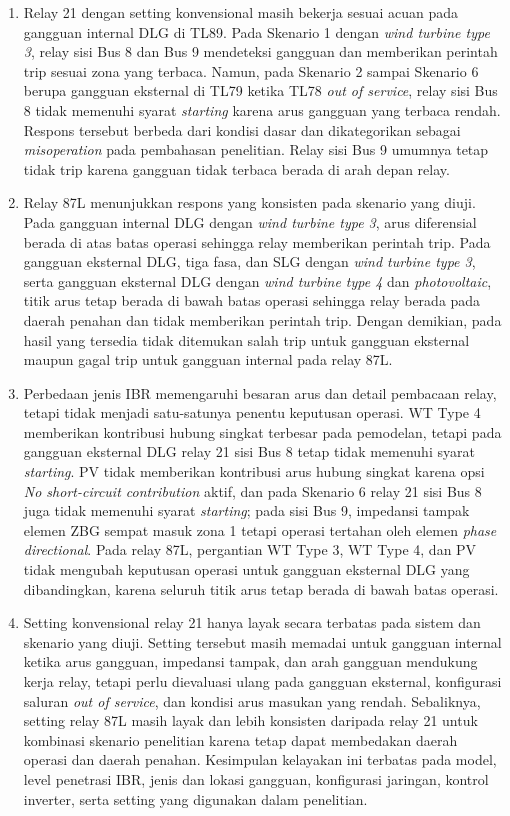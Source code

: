 \begin{enumerate}
	\item Relay 21 dengan setting konvensional masih bekerja sesuai acuan pada gangguan internal DLG di TL89. Pada Skenario 1 dengan \textit{wind turbine type 3}, relay sisi Bus 8 dan Bus 9 mendeteksi gangguan dan memberikan perintah trip sesuai zona yang terbaca. Namun, pada Skenario 2 sampai Skenario 6 berupa gangguan eksternal di TL79 ketika TL78 \textit{out of service}, relay sisi Bus 8 tidak memenuhi syarat \textit{starting} karena arus gangguan yang terbaca rendah. Respons tersebut berbeda dari kondisi dasar dan dikategorikan sebagai \textit{misoperation} pada pembahasan penelitian. Relay sisi Bus 9 umumnya tetap tidak trip karena gangguan tidak terbaca berada di arah depan relay.

	\item Relay 87L menunjukkan respons yang konsisten pada skenario yang diuji. Pada gangguan internal DLG dengan \textit{wind turbine type 3}, arus diferensial berada di atas batas operasi sehingga relay memberikan perintah trip. Pada gangguan eksternal DLG, tiga fasa, dan SLG dengan \textit{wind turbine type 3}, serta gangguan eksternal DLG dengan \textit{wind turbine type 4} dan \textit{photovoltaic}, titik arus tetap berada di bawah batas operasi sehingga relay berada pada daerah penahan dan tidak memberikan perintah trip. Dengan demikian, pada hasil yang tersedia tidak ditemukan salah trip untuk gangguan eksternal maupun gagal trip untuk gangguan internal pada relay 87L.

	\item Perbedaan jenis IBR memengaruhi besaran arus dan detail pembacaan relay, tetapi tidak menjadi satu-satunya penentu keputusan operasi. WT Type 4 memberikan kontribusi hubung singkat terbesar pada pemodelan, tetapi pada gangguan eksternal DLG relay 21 sisi Bus 8 tetap tidak memenuhi syarat \textit{starting}. PV tidak memberikan kontribusi arus hubung singkat karena opsi \textit{No short-circuit contribution} aktif, dan pada Skenario 6 relay 21 sisi Bus 8 juga tidak memenuhi syarat \textit{starting}; pada sisi Bus 9, impedansi tampak elemen ZBG sempat masuk zona 1 tetapi operasi tertahan oleh elemen \textit{phase directional}. Pada relay 87L, pergantian WT Type 3, WT Type 4, dan PV tidak mengubah keputusan operasi untuk gangguan eksternal DLG yang dibandingkan, karena seluruh titik arus tetap berada di bawah batas operasi.

	\item Setting konvensional relay 21 hanya layak secara terbatas pada sistem dan skenario yang diuji. Setting tersebut masih memadai untuk gangguan internal ketika arus gangguan, impedansi tampak, dan arah gangguan mendukung kerja relay, tetapi perlu dievaluasi ulang pada gangguan eksternal, konfigurasi saluran \textit{out of service}, dan kondisi arus masukan yang rendah. Sebaliknya, setting relay 87L masih layak dan lebih konsisten daripada relay 21 untuk kombinasi skenario penelitian karena tetap dapat membedakan daerah operasi dan daerah penahan. Kesimpulan kelayakan ini terbatas pada model, level penetrasi IBR, jenis dan lokasi gangguan, konfigurasi jaringan, kontrol inverter, serta setting yang digunakan dalam penelitian.
\end{enumerate}

